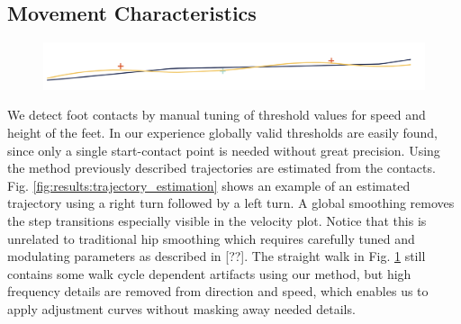 \subsection{Movement Characteristics}


\begin{figure}
    \centering
    \includegraphics[width=1.0\columnwidth]{img/straight_trajectory.png}
    \caption{}
    \label{fig:results:trajectory_straight}
\end{figure}
We detect foot contacts by manual tuning of threshold values for speed and height of the feet. In our experience globally valid thresholds are easily found, since only a single start-contact point is needed without great precision. Using the method previously described trajectories are estimated from the contacts. Fig. \ref{fig:results:trajectory_estimation} shows an example of an estimated trajectory using a right turn followed by a left turn. A global smoothing removes the step transitions especially visible in the velocity plot. Notice that this is unrelated to traditional hip smoothing which requires carefully tuned and modulating parameters as described in [??]. The straight walk in Fig. \ref{fig:results:trajectory_straight} still contains some walk cycle dependent artifacts using our method, but high frequency details are removed from direction and speed, which enables us to apply adjustment curves without masking away needed details. 

